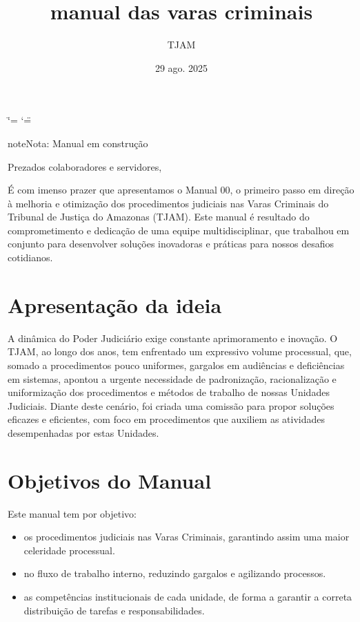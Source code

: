 \documentclass[letterpaper,10pt,brazil]{sphinxmanual}
\title{manual das varas criminais}
\date{29 ago. 2025}
\author{TJAM}
\begin{document}
\ifdefined\shorthandoff
  \ifnum\catcode`\=\string=\active\shorthandoff{=}\fi
  \ifnum\catcode`\"=\active{}\fi
\fi

\pagestyle{empty}
\sphinxmaketitle
\pagestyle{plain}
\sphinxtableofcontents
\pagestyle{normal}
\label{\detokenize{index::doc}}


\begin{sphinxadmonition}{note}{Nota:}
\sphinxAtStartPar
Manual em construção
\end{sphinxadmonition}

\sphinxAtStartPar
Prezados colaboradores e servidores,

\sphinxAtStartPar
É com imenso prazer que apresentamos o Manual 00, o primeiro passo em direção à melhoria e otimização dos procedimentos judiciais nas Varas Criminais do Tribunal de Justiça do Amazonas (TJAM). Este manual é resultado do comprometimento e dedicação de uma equipe multidisciplinar, que trabalhou em conjunto para desenvolver soluções inovadoras e práticas para nossos desafios cotidianos.


\chapter{Apresentação da ideia}
\label{\detokenize{index:apresentacao-da-ideia}}
\sphinxAtStartPar
A dinâmica do Poder Judiciário exige constante aprimoramento e inovação. O TJAM, ao longo dos anos, tem enfrentado um expressivo volume processual, que, somado a procedimentos pouco uniformes, gargalos em audiências e deficiências em sistemas, apontou a urgente necessidade de padronização, racionalização e uniformização dos procedimentos e métodos de trabalho de nossas Unidades Judiciais. Diante deste cenário, foi criada uma comissão para propor soluções eficazes e eficientes, com foco em procedimentos que auxiliem as atividades desempenhadas por estas Unidades.


\chapter{Objetivos do Manual}
\label{\detokenize{index:objetivos-do-manual}}
\sphinxAtStartPar
Este manual tem por objetivo:
\begin{itemize}
\item {} 
\sphinxAtStartPar
{} os procedimentos judiciais nas Varas Criminais, garantindo assim uma maior celeridade processual.

\item {} 
\sphinxAtStartPar
{} no fluxo de trabalho interno, reduzindo gargalos e agilizando processos.

\item {} 
\sphinxAtStartPar
{} as competências institucionais de cada unidade, de forma a garantir a correta distribuição de tarefas e responsabilidades.

\end{itemize}
\end{document}

